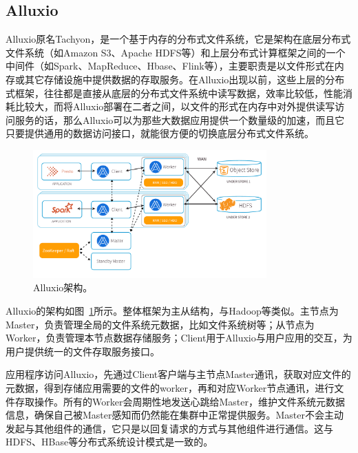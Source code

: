 \subsection{Alluxio}

\par Alluxio原名Tachyon，是一个基于内存的分布式文件系统，它是架构在底层分布式文件系统（如Amazon S3、Apache HDFS等）和上层分布式计算框架之间的一个中间件（如Spark、MapReduce、Hbase、Flink等），主要职责是以文件形式在内存或其它存储设施中提供数据的存取服务。在Alluxio出现以前，这些上层的分布式框架，往往都是直接从底层的分布式文件系统中读写数据，效率比较低，性能消耗比较大，而将Alluxio部署在二者之间，以文件的形式在内存中对外提供读写访问服务的话，那么Alluxio可以为那些大数据应用提供一个数量级的加速，而且它只要提供通用的数据访问接口，就能很方便的切换底层分布式文件系统。

\begin{figure}[]
	\centering
	\includegraphics[width=0.8\textwidth]{img/simple-solution/alluxio-archi}
	
	\caption{Alluxio架构。}
	\label{fig:alluxio-archi}
\end{figure}

\par Alluxio的架构如图~\ref{fig:alluxio-archi}所示。整体框架为主从结构，与Hadoop\cite{hdfs}等类似。主节点为Master，负责管理全局的文件系统元数据，比如文件系统树等；从节点为Worker，负责管理本节点数据存储服务；Client用于Alluxio与用户应用的交互，为用户提供统一的文件存取服务接口。

\par 应用程序访问Alluxio，先通过Client客户端与主节点Master通讯，获取对应文件的元数据，得到存储应用需要的文件的worker，再和对应Worker节点通讯，进行文件存取操作。所有的Worker会周期性地发送心跳给Master，维护文件系统元数据信息，确保自己被Master感知而仍然能在集群中正常提供服务。Master不会主动发起与其他组件的通信，它只是以回复请求的方式与其他组件进行通信。这与HDFS、HBase等分布式系统设计模式是一致的。

